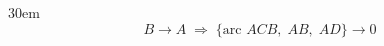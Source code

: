 \documentclass[border=4pt]{standalone}
\begin{document}
\begin{varwidth}{30em}
\large
\[ B \to A \;\Rightarrow\; \{\text{arc } ACB,\; AB,\; AD\} \to 0 \]

\end{varwidth}
\end{document}
